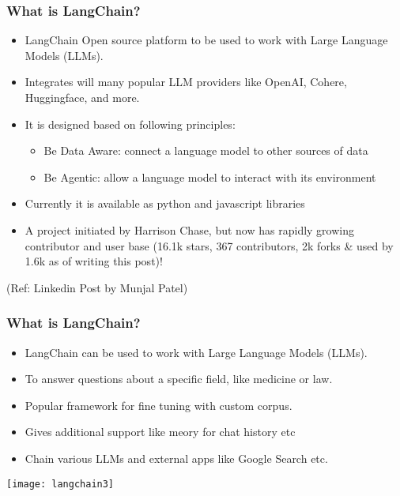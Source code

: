 \begin{frame}[fragile]
\begin{frame}\frametitle{What is LangChain?}

\begin{itemize}
\item LangChain Open source platform to be used to work with Large Language Models (LLMs). 
\item Integrates will many popular LLM providers like OpenAI, Cohere, Huggingface, and more.  
\item It is designed based on following principles:
	\begin{itemize}
	\item Be Data Aware: connect a language model to other sources of data
	\item Be Agentic: allow a language model to interact with its environment
	\end{itemize}
\item Currently it is available as python and javascript libraries
\item A project initiated by Harrison Chase, but now has rapidly growing contributor and user base (16.1k stars, 367 contributors, 2k forks \& used by 1.6k as of writing this post)!
\end{itemize}

{\tiny (Ref: Linkedin Post by Munjal Patel)}
\end{frame}

\begin{frame}\frametitle{What is LangChain?}

\begin{itemize}
\item LangChain can be used to work with Large Language Models (LLMs). 
\item To answer questions about a specific field, like medicine or law. 
\item Popular framework for fine tuning with custom corpus.
\item Gives additional support like meory for chat history etc
\item Chain various LLMs and external apps like Google Search etc.
\end{itemize}

\begin{center}
\texttt{[image: langchain3]}
\end{center}	  



\end{frame}
\end{frame}
